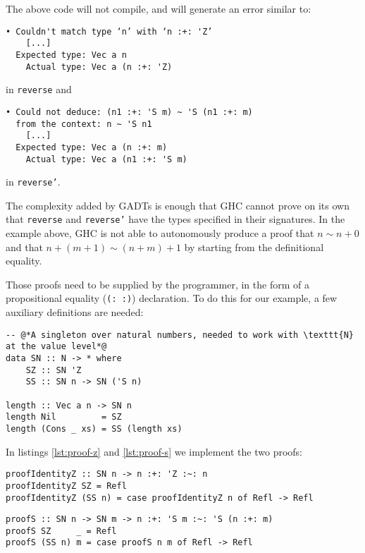 The above code will not compile, and will generate an error similar to:

\begin{verbatim}
• Couldn't match type ‘n’ with ‘n :+: 'Z’
    [...]
  Expected type: Vec a n
    Actual type: Vec a (n :+: 'Z)
\end{verbatim}

in \texttt{reverse} and

\begin{verbatim}
• Could not deduce: (n1 :+: 'S m) ~ 'S (n1 :+: m)
  from the context: n ~ 'S n1
    [...]
  Expected type: Vec a (n :+: m)
    Actual type: Vec a (n1 :+: 'S m)
\end{verbatim}

in \texttt{reverse'}.

The complexity added by GADTs is enough that GHC cannot prove on its own that \texttt{reverse} and \texttt{reverse'} have the types specified in their signatures.
In the example above, GHC is not able to autonomously produce a proof that $n \sim n+0$ and that $n+(m+1) \sim (n+m)+1$ by starting from the definitional equality.

Those proofs need to be supplied by the programmer, in the form of a propositional equality (\texttt{(:~:)}) declaration.
To do this for our example, a few auxiliary definitions are needed:

\begin{lstlisting}[caption=Bringing \texttt{N} to the value level]
-- @*A singleton over natural numbers, needed to work with \texttt{N} at the value level*@
data SN :: N -> * where
    SZ :: SN 'Z
    SS :: SN n -> SN ('S n)

length :: Vec a n -> SN n
length Nil         = SZ
length (Cons _ xs) = SS (length xs)
\end{lstlisting}

In listings \ref{lst:proof-z} and \ref{lst:proof-s} we implement the two proofs:

\begin{lstlisting}[caption=A proof of the right identity element in type-level addition, label=lst:proof-z]
proofIdentityZ :: SN n -> n :+: 'Z :~: n
proofIdentityZ SZ = Refl
proofIdentityZ (SS n) = case proofIdentityZ n of Refl -> Refl
\end{lstlisting}

\begin{lstlisting}[caption=A proof that $n+(m+1) \sim (n+m)+1$, label=lst:proof-s]
proofS :: SN n -> SN m -> n :+: 'S m :~: 'S (n :+: m)
proofS SZ     _ = Refl
proofS (SS n) m = case proofS n m of Refl -> Refl
\end{lstlisting}

